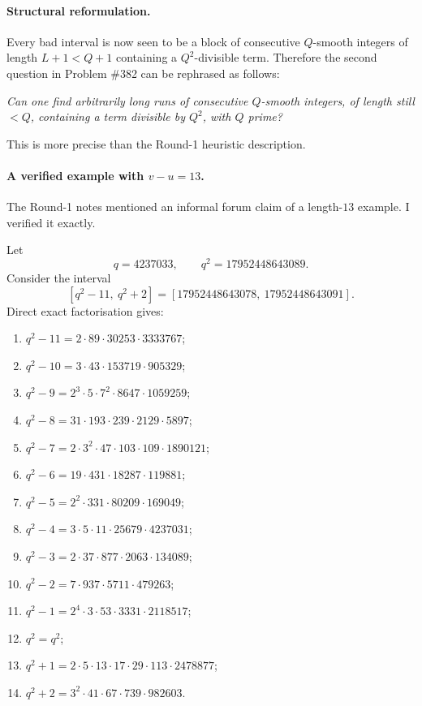 \paragraph{Structural reformulation.}
Every bad interval is now seen to be a block of consecutive $Q$-smooth integers of length $L+1<Q+1$ containing a $Q^2$-divisible term. Therefore the second question in Problem \#382 can be rephrased as follows:

\medskip

\noindent\emph{Can one find arbitrarily long runs of consecutive $Q$-smooth integers, of length still $<Q$, containing a term divisible by $Q^2$, with $Q$ prime?}

\medskip

This is more precise than the Round-1 heuristic description.

\paragraph{A verified example with $v-u=13$.}
The Round-1 notes mentioned an informal forum claim of a length-$13$ example. I verified it exactly.

Let
\[
q=4237033,\qquad q^2=17952448643089.
\]
Consider the interval
\[
[q^2-11,\ q^2+2]
=
[17952448643078,\ 17952448643091].
\]
Direct exact factorisation gives:

\begin{enumerate}
\item $q^2-11=2\cdot 89\cdot 30253\cdot 3333767$;
\item $q^2-10=3\cdot 43\cdot 153719\cdot 905329$;
\item $q^2-9=2^3\cdot 5\cdot 7^2\cdot 8647\cdot 1059259$;
\item $q^2-8=31\cdot 193\cdot 239\cdot 2129\cdot 5897$;
\item $q^2-7=2\cdot 3^2\cdot 47\cdot 103\cdot 109\cdot 1890121$;
\item $q^2-6=19\cdot 431\cdot 18287\cdot 119881$;
\item $q^2-5=2^2\cdot 331\cdot 80209\cdot 169049$;
\item $q^2-4=3\cdot 5\cdot 11\cdot 25679\cdot 4237031$;
\item $q^2-3=2\cdot 37\cdot 877\cdot 2063\cdot 134089$;
\item $q^2-2=7\cdot 937\cdot 5711\cdot 479263$;
\item $q^2-1=2^4\cdot 3\cdot 53\cdot 3331\cdot 2118517$;
\item $q^2=q^2$;
\item $q^2+1=2\cdot 5\cdot 13\cdot 17\cdot 29\cdot 113\cdot 2478877$;
\item $q^2+2=3^2\cdot 41\cdot 67\cdot 739\cdot 982603$.
\end{enumerate}

